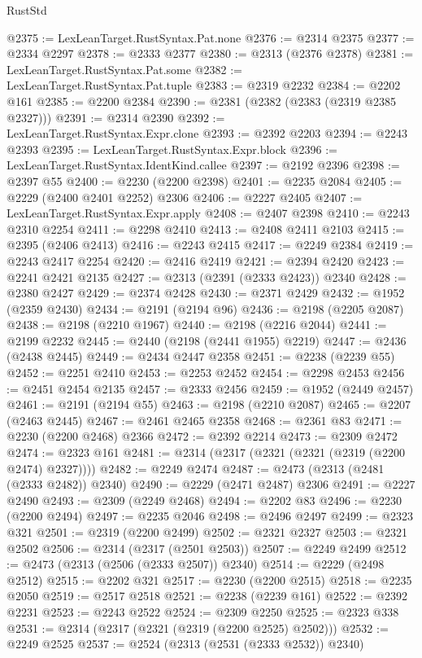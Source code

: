 \begin{lexlean}{RustStd}
\begin{coremodule}
@2375 := LexLeanTarget.RustSyntax.Pat.none
@2376 := @2314 @2375
@2377 := @2334 @2297
@2378 := @2333 @2377
@2380 := @2313 (@2376 @2378)
@2381 := LexLeanTarget.RustSyntax.Pat.some
@2382 := LexLeanTarget.RustSyntax.Pat.tuple
@2383 := @2319 @2232
@2384 := @2202 @161
@2385 := @2200 @2384
@2390 := @2381 (@2382 (@2383 (@2319 @2385 @2327)))
@2391 := @2314 @2390
@2392 := LexLeanTarget.RustSyntax.Expr.clone
@2393 := @2392 @2203
@2394 := @2243 @2393
@2395 := LexLeanTarget.RustSyntax.Expr.block
@2396 := LexLeanTarget.RustSyntax.IdentKind.callee
@2397 := @2192 @2396
@2398 := @2397 @55
@2400 := @2230 (@2200 @2398)
@2401 := @2235 @2084
@2405 := @2229 (@2400 @2401 @2252) @2306
@2406 := @2227 @2405
@2407 := LexLeanTarget.RustSyntax.Expr.apply
@2408 := @2407 @2398
@2410 := @2243 @2310 @2254
@2411 := @2298 @2410
@2413 := @2408 @2411 @2103
@2415 := @2395 (@2406 @2413)
@2416 := @2243 @2415
@2417 := @2249 @2384
@2419 := @2243 @2417 @2254
@2420 := @2416 @2419
@2421 := @2394 @2420
@2423 := @2241 @2421 @2135
@2427 := @2313 (@2391 (@2333 @2423)) @2340
@2428 := @2380 @2427
@2429 := @2374 @2428
@2430 := @2371 @2429
@2432 := @1952 (@2359 @2430)
@2434 := @2191 (@2194 @96)
@2436 := @2198 (@2205 @2087)
@2438 := @2198 (@2210 @1967)
@2440 := @2198 (@2216 @2044)
@2441 := @2199 @2232
@2445 := @2440 (@2198 (@2441 @1955) @2219)
@2447 := @2436 (@2438 @2445)
@2449 := @2434 @2447 @2358
@2451 := @2238 (@2239 @55)
@2452 := @2251 @2410
@2453 := @2253 @2452
@2454 := @2298 @2453
@2456 := @2451 @2454 @2135
@2457 := @2333 @2456
@2459 := @1952 (@2449 @2457)
@2461 := @2191 (@2194 @55)
@2463 := @2198 (@2210 @2087)
@2465 := @2207 (@2463 @2445)
@2467 := @2461 @2465 @2358
@2468 := @2361 @83
@2471 := @2230 (@2200 @2468) @2366
@2472 := @2392 @2214
@2473 := @2309 @2472
@2474 := @2323 @161
@2481 := @2314 (@2317 (@2321 (@2321 (@2319 (@2200 @2474) @2327))))
@2482 := @2249 @2474
@2487 := @2473 (@2313 (@2481 (@2333 @2482)) @2340)
@2490 := @2229 (@2471 @2487) @2306
@2491 := @2227 @2490
@2493 := @2309 (@2249 @2468)
@2494 := @2202 @83
@2496 := @2230 (@2200 @2494)
@2497 := @2235 @2046
@2498 := @2496 @2497
@2499 := @2323 @321
@2501 := @2319 (@2200 @2499)
@2502 := @2321 @2327
@2503 := @2321 @2502
@2506 := @2314 (@2317 (@2501 @2503))
@2507 := @2249 @2499
@2512 := @2473 (@2313 (@2506 (@2333 @2507)) @2340)
@2514 := @2229 (@2498 @2512)
@2515 := @2202 @321
@2517 := @2230 (@2200 @2515)
@2518 := @2235 @2050
@2519 := @2517 @2518
@2521 := @2238 (@2239 @161)
@2522 := @2392 @2231
@2523 := @2243 @2522
@2524 := @2309 @2250
@2525 := @2323 @338
@2531 := @2314 (@2317 (@2321 (@2319 (@2200 @2525) @2502)))
@2532 := @2249 @2525
@2537 := @2524 (@2313 (@2531 (@2333 @2532)) @2340)

\end{coremodule}
\end{lexlean}

